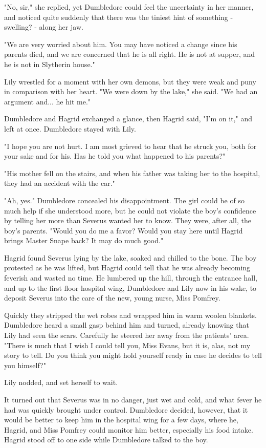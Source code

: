 \documentclass[a4paper,11pt]{article}
\begin{document}
"No, sir," she replied, yet Dumbledore could feel the uncertainty in her manner, and noticed quite suddenly that there was the tiniest hint of something - swelling? - along her jaw.

"We are very worried about him. You may have noticed a change since his parents died, and we are concerned that he is all right. He is not at supper, and he is not in Slytherin house."

Lily wrestled for a moment with her own demons, but they were weak and puny in comparison with her heart. "We were down by the lake," she said. "We had an argument and... he hit me."

Dumbledore and Hagrid exchanged a glance, then Hagrid said, "I'm on it," and left at once. Dumbledore stayed with Lily.

"I hope you are not hurt. I am most grieved to hear that he struck you, both for your sake and for his. Has he told you what happened to his parents?"

"His mother fell on the stairs, and when his father was taking her to the hospital, they had an accident with the car."

"Ah, yes." Dumbledore concealed his disappointment. The girl could be of so much help if she understood more, but he could not violate the boy's confidence by telling her more than Severus wanted her to know. They were, after all, the boy's parents. "Would you do me a favor? Would you stay here until Hagrid brings Master Snape back? It may do much good."

Hagrid found Severus lying by the lake, soaked and chilled to the bone. The boy protested as he was lifted, but Hagrid could tell that he was already becoming feverish and wasted no time. He lumbered up the hill, through the entrance hall, and up to the first floor hospital wing, Dumbledore and Lily now in his wake, to deposit Severus into the care of the new, young nurse, Miss Pomfrey.

Quickly they stripped the wet robes and wrapped him in warm woolen blankets. Dumbledore heard a small gasp behind him and turned, already knowing that Lily had seen the scars. Carefully he steered her away from the patients' area. "There is much that I wish I could tell you, Miss Evans, but it is, alas, not my story to tell. Do you think you might hold yourself ready in case he decides to tell you himself?"

Lily nodded, and set herself to wait.

It turned out that Severus was in no danger, just wet and cold, and what fever he had was quickly brought under control. Dumbledore decided, however, that it would be better to keep him in the hospital wing for a few days, where he, Hagrid, and Miss Pomfrey could monitor him better, especially his food intake. Hagrid stood off to one side while Dumbledore talked to the boy.
\end{document}
